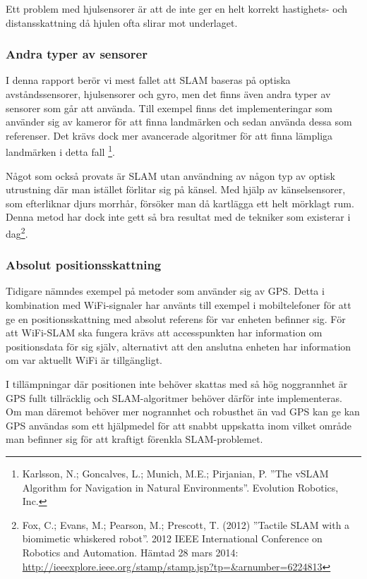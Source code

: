 \documentclass[a4paper,12pt,fleqn]{article}
\begin{document}
Ett problem med hjulsensorer är att de inte ger en helt korrekt hastighets- och distansskattning då hjulen ofta slirar mot underlaget.

\subsubsection{Andra typer av sensorer}

I denna rapport berör vi mest fallet att SLAM baseras på optiska avståndssensorer, hjulsensorer och gyro, men det finns även andra typer av sensorer som går att använda. Till exempel finns det implementeringar som använder sig av kameror för att finna landmärken och sedan använda dessa som referenser. Det krävs dock mer avancerade algoritmer för att finna lämpliga landmärken i detta fall \footnote{Karlsson, N.; Goncalves, L.; Munich, M.E.; Pirjanian, P. ''The vSLAM Algorithm for Navigation in Natural Environments''. Evolution Robotics, Inc.}.

Något som också provats är SLAM utan användning av någon typ av optisk utrustning där man istället förlitar sig på känsel. Med hjälp av känselsensorer, som efterliknar djurs morrhår, försöker man då kartlägga ett helt mörklagt rum. Denna metod har dock inte gett så bra resultat med de tekniker som existerar i dag\footnote{Fox, C.; Evans, M.; Pearson, M.; Prescott, T. (2012)
''Tactile SLAM with a biomimetic whiskered robot''. 2012 IEEE International Conference on Robotics and Automation. Hämtad 28 mars 2014:
\url{http://ieeexplore.ieee.org/stamp/stamp.jsp?tp=&arnumber=6224813}
}. 

\subsubsection{Absolut positionsskattning}Tidigare nämndes exempel på metoder som använder sig av GPS. Detta i kombination med WiFi-signaler har använts till exempel i mobiltelefoner för att ge en positionsskattning med absolut referens för var enheten befinner sig. För att WiFi-SLAM ska fungera krävs att accesspunkten har information om positionsdata för sig själv, alternativt att den anslutna enheten har information om var aktuellt WiFi är tillgängligt.

I tillämpningar där positionen inte behöver skattas med så hög noggrannhet är GPS fullt tillräcklig och SLAM-algoritmer behöver därför inte implementeras. Om man däremot behöver mer nogrannhet och robusthet än vad GPS kan ge kan GPS användas som ett hjälpmedel för att snabbt uppskatta inom vilket område man befinner sig för att kraftigt förenkla SLAM-problemet. 
\end{document}
